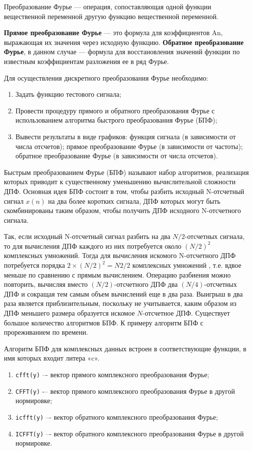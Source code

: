 \documentclass[14pt,a4paper]{extreport}
\begin{document}
Преобразование Фурье — операция, сопоставляющая одной функции вещественной переменной другую функцию вещественной переменной. 

\textbf{Прямое преобразование Фурье} — это формула для коэффициентов An, выражающая их значения через исходную функцию.
\textbf{Обратное преобразование Фурье}, в данном случае — формула для восстановления значений функции по известным коэффициентам разложения ее в ряд Фурье. 

Для осуществления дискретного преобразования Фурье необходимо:

\begin{enumerate}
\item Задать функцию тестового сигнала;
\item Провести процедуру прямого и обратного преобразования Фурье с использованием алгоритма быстрого преобразования Фурье (БПФ);
\item	Вывести результаты в виде графиков:
\subitem	функция сигнала (в зависимости от числа отсчетов);
\subitem	прямое преобразование Фурье (в зависимости от частоты);
\subitem	обратное преобразование Фурье (в зависимости от числа отсчетов).
\end{enumerate}


Быстрым преобразованием Фурье (БПФ) называют набор алгоритмов, реализация которых приводит к существенному уменьшению вычислительной сложности ДПФ. Основная идея БПФ состоит в том, чтобы разбить исходный N-отсчетный сигнал $x(n)$ на два более коротких сигнала, ДПФ которых могут быть скомбинированы таким образом, чтобы получить ДПФ исходного N-отсчетного сигнала. 

Так, если исходный N-отсчетный сигнал разбить на два $N/2$-отсчетных сигнала, то для вычисления ДПФ каждого из них потребуется около $(N/2)^{2}$ комплексных умножений. Тогда для вычисления искомого N-отсчетного ДПФ потребуется порядка $2 \times (N/2)^{2} = N2/2$ комплексных умножений , т.е. вдвое меньше по сравнению с прямым вычислением. Операцию разбиения можно повторить, вычисляя вместо $(N/2)$-отсчетного ДПФ два $(N/4)$-отсчетных ДПФ и сокращая тем самым объем вычислений еще в два раза. Выигрыш в два раза является приблизительным, поскольку не учитывается, каким образом из ДПФ меньшего размера образуется искомое $N$-отсчетное ДПФ. Существует большое количество алгоритмов БПФ. К примеру алгоритм БПФ с прореживанием по времени.

Алгоритм БПФ для комплексных данных встроен в соответствующие функции, в имя которых входит литера «c».
\begin{enumerate}
\item \texttt{cfft(y)} –- вектор прямого комплексного преобразования Фурье;
\item \texttt{CFFT(y)} -– вектор прямого комплексного преобразования Фурье в другой нормировке;
\item \texttt{icfft(y)} –- вектор обратного комплексного преобразования Фурье;
\item \texttt{ICFFT(y)} –- вектор обратного комплексного преобразования Фурье в другой нормировке.
\end{enumerate}
\end{document}
